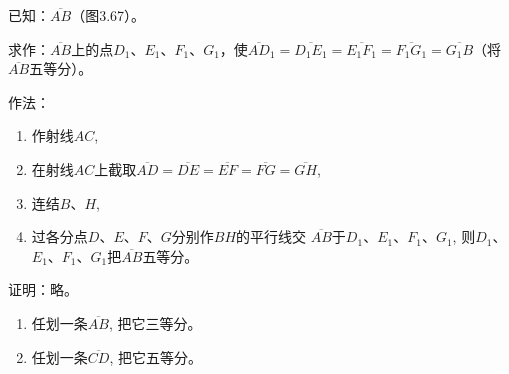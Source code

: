 \begin{example}
    已知：$\overline{AB}$（图3.67）。

求作：$\overline{AB}$上的点$D_1$、$E_1$、$F_1$、$G_1$，使$\overline{AD}_1=\overline{D_1E_1}=\overline{E_1F_1}=\overline{F_1G_1}=\overline{G_1B}$（将$\overline{AB}$五等分）。

作法：
\begin{enumerate}
    \item  作射线$AC$,
    \item  在射线$AC$上截取$\overline{AD}=\overline{DE}=\overline{EF}=\overline{FG}=\overline{GH}$,
    \item  连结$B$、$H$,
    \item  过各分点$D$、$E$、$F$、$G$分别作$BH$的平行线交
$\overline{AB}$于$D_1$、$E_1$、$F_1$、$G_1$, 则$D_1$、$E_1$、$F_1$、$G_1$把$\overline{AB}$五等分。
\end{enumerate}

证明：略。
\end{example}

\begin{ex}
\begin{enumerate}
    \item 任划一条$\overline{AB}$, 把它三等分。
    \item 任划一条$\overline{CD}$, 把它五等分。
\end{enumerate}
\end{ex}

